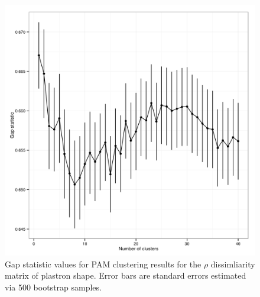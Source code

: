 \documentclass[12pt,letterpaper]{article}\usepackage{graphicx, color}
\begin{document}
\begin{figure}[ht]
  \centering
  \includegraphics[width = \textwidth]{figure/gap_res}
  \caption{Gap statistic values for PAM clustering results for the \(\rho\) dissimliarity matrix of plastron shape. Error bars are standard errors estimated via 500 bootstrap samples.}
  \label{fig:gap}
\end{figure}
\end{document}
